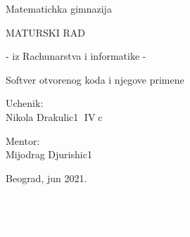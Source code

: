 \documentclass[a4paper,fleqn,12pt]{JMThesis}
\theoremstyle{plain}
\theoremstyle{definition}
\begin{document}

\thispagestyle{empty}

\begin{center}
{\matematicka Matematichka gimnazija}
\end{center}
\vspace*{50mm}

\begin{center}
{\maturski MATURSKI RAD}

\vspace*{8pt}
{\naslov - iz Rachunarstva i informatike -}
\end{center}

\vspace*{10pt}
\begin{center}
{\naslov Softver otvorenog koda i njegove primene}



\end{center}

\vspace*{70mm}
\setlength{\columnsep}{50pt}
\begin{multicols}{2}
 {\noindent \imen Uchenik:
\\Nikola Drakulic1  $\operatorname{IV}$c}


{ \noindent \hfill \imen Mentor:\\
\hfill \phantom{aa} Mijodrag Djurishic1 }
\end{multicols}

\vfill
\begin{center}
{\imen Beograd, jun 2021.}
\end{center}
\newpage
\clearpage

\thispagestyle{empty}
\textcolor{white}{proba}

\newpage


\renewcommand{\contentsname}{Sadrzhaj}
\thispagestyle{empty}


\tableofcontents \clearpage

\thispagestyle{empty}
\textcolor{white}{proba}
\clearpage

\renewcommand{\chaptername}{}
\setcounter{page}{1}
\end{document}
